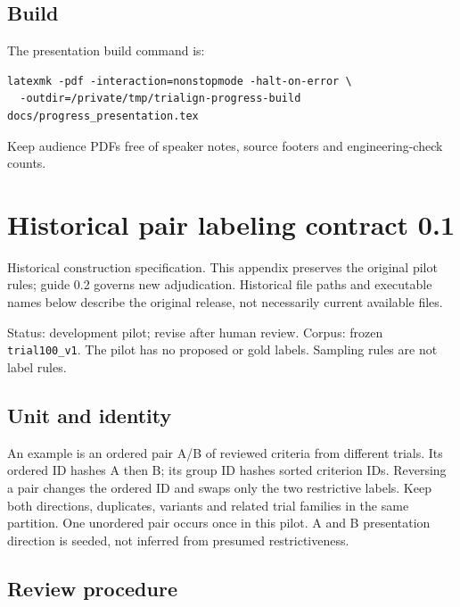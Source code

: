 \documentclass[10pt,letterpaper]{article}
\newcommand{\pathcode}[1]{\nolinkurl{#1}}
\begin{document}
\subsection{Build}\label{demo-build}
The presentation build command is:
\begin{Verbatim}[breaklines=true,fontsize=\small]
latexmk -pdf -interaction=nonstopmode -halt-on-error \
  -outdir=/private/tmp/trialign-progress-build docs/progress_presentation.tex
\end{Verbatim}
Keep audience PDFs free of speaker notes, source footers and engineering-check counts.

\section{Historical pair labeling contract 0.1}\label{contract01-historical-pair-labeling-contract-01}\label{sec:labelingcontract01}

Historical construction specification. This appendix preserves the original pilot rules; guide 0.2 governs new adjudication. Historical file paths and executable names below describe the original release, not necessarily current available files.

Status: development pilot; revise after human review. Corpus: frozen \pathcode{trial100_v1}. The pilot has no proposed or gold labels. Sampling rules are not label rules.

\subsection{Unit and identity}\label{contract01-unit-and-identity}

An example is an ordered pair A/B of reviewed criteria from different trials. Its ordered ID hashes A then B; its group ID hashes sorted criterion IDs. Reversing a pair changes the ordered ID and swaps only the two restrictive labels. Keep both directions, duplicates, variants and related trial families in the same partition. One unordered pair occurs once in this pilot. A and B presentation direction is seeded, not inferred from presumed restrictiveness.

\subsection{Review procedure}\label{contract01-review-procedure}
\end{document}
